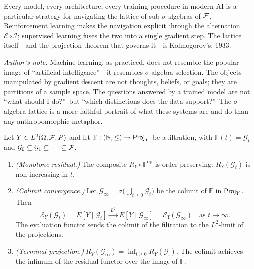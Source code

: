 \begin{remark}
\noindent Every model, every architecture, every training procedure in modern AI is a particular strategy for navigating the lattice of sub-$\sigma$-algebras of $\mathcal{F}$. Reinforcement learning makes the navigation explicit through the alternation $\mathcal{E} \circ \mathcal{I}$; supervised learning fuses the two into a single gradient step. The lattice itself---and the projection theorem that governs it---is Kolmogorov's, 1933.

\smallskip
\noindent\textit{Author's note.} Machine learning, as practiced, does not resemble the popular image of ``artificial intelligence''---it resembles $\sigma$-algebra selection. The objects manipulated by gradient descent are not thoughts, beliefs, or goals; they are partitions of a sample space. The questions answered by a trained model are not ``what should I do?''\ but ``which distinctions does the data support?''\ The $\sigma$-algebra lattice is a more faithful portrait of what these systems are and do than any anthropomorphic metaphor.
\end{remark}

\begin{theorem}\label{thm:in-context-gpi}
Let $Y \in L^2(\Omega, \mathcal{F}, P)$ and let
$\mathbb{F} : (\mathbb{N}, \leq) \to \mathsf{Proj}_Y$ be a filtration, with
$\mathbb{F}(t) = \mathcal{G}_t$ and
$\mathcal{G}_0 \subseteq \mathcal{G}_1 \subseteq \cdots \subseteq \mathcal{F}$.
\begin{enumerate}[label=(\roman*)]
\item \emph{(Monotone residual.)} The composite
$R_Y \circ \mathbb{F}^{\mathrm{op}}$ is order-preserving:
$R_Y(\mathcal{G}_t)$ is non-increasing in $t$.

\item \emph{(Colimit convergence.)} Let
$\mathcal{G}_\infty = \sigma\!\bigl(\bigcup_{t \geq 0} \mathcal{G}_t\bigr)$
be the colimit of $\mathbb{F}$ in $\mathsf{Proj}_Y$. Then
\[
\mathcal{E}_Y(\mathcal{G}_t) = E[Y \mid \mathcal{G}_t]
\xrightarrow{\;L^2\;} E[Y \mid \mathcal{G}_\infty]
= \mathcal{E}_Y(\mathcal{G}_\infty)
\quad \text{as } t \to \infty.
\]
The evaluation functor sends the colimit of the filtration to the
$L^2$-limit of the projections.

\item \emph{(Terminal projection.)}
$R_Y(\mathcal{G}_\infty) = \inf_{t \geq 0} R_Y(\mathcal{G}_t)$.
The colimit achieves the infimum of the residual functor over the image
of $\mathbb{F}$.
\end{enumerate}
\end{theorem}

